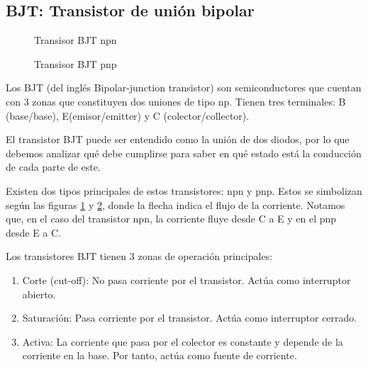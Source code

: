 \documentclass[11pt,fancy,lang=es]{elegantbook}
\begin{document}
\fi

\subsection{BJT: Transistor de unión bipolar}
\begin{figure}[!h]
    \centering
    \caption{Transisor BJT npn}
    \label{fig:BJTnpn}
\end{figure}

\begin{figure}[!h]
    \centering
    \caption{Transisor BJT pnp}
    \label{fig:BJTpnp}
\end{figure}
Los BJT (del inglés Bipolar-junction transistor) son semiconductores que cuentan con 3 zonas que constituyen dos uniones de tipo np. Tienen tres terminales: B (base/base), E(emisor/emitter) y C (colector/collector).

El transistor BJT puede ser entendido como la unión de dos diodos, por lo que debemos analizar qué debe cumplirse para saber en qué estado está la conducción de cada parte de este.

Existen dos tipos principales de estos transistores: npn y pnp. Estos se simbolizan según las figuras \ref{fig:BJTnpn} y \ref{fig:BJTpnp}, donde la flecha indica el flujo de la corriente. Notamos que, en el caso del transistor npn, la corriente fluye desde C a E y en el pnp desde E a C.



Los transistores BJT tienen 3 zonas de operación principales:
\begin{enumerate}
    \item Corte (cut-off): No pasa corriente por el transistor. Actúa como interruptor abierto.
    \item Saturación: Pasa corriente por el transistor. Actúa como interruptor cerrado.
    \item Activa: La corriente que pasa por el colector es constante y depende de la corriente en la base. Por tanto, actúa como fuente de corriente.
\end{enumerate}
\end{document}
